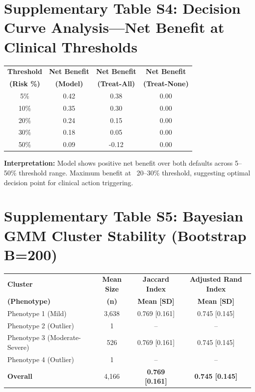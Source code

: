 \documentclass[11pt]{article}
\begin{document}
\section*{Supplementary Table S4: Decision Curve Analysis—Net Benefit at Clinical Thresholds}

\begin{table}[ht]
\centering
\begin{tabular}{cccc}
\toprule
\textbf{Threshold} & \textbf{Net Benefit} & \textbf{Net Benefit} & \textbf{Net Benefit} \\
\textbf{(Risk \%)} & \textbf{(Model)} & \textbf{(Treat-All)} & \textbf{(Treat-None)} \\
\midrule
5\% & 0.42 & 0.38 & 0.00 \\
10\% & 0.35 & 0.30 & 0.00 \\
20\% & 0.24 & 0.15 & 0.00 \\
30\% & 0.18 & 0.05 & 0.00 \\
50\% & 0.09 & -0.12 & 0.00 \\
\bottomrule
\end{tabular}
\end{table}

\textbf{Interpretation:} Model shows positive net benefit over both defaults across 5--50\% threshold range. Maximum benefit at ~20--30\% threshold, suggesting optimal decision point for clinical action triggering.

\section*{Supplementary Table S5: Bayesian GMM Cluster Stability (Bootstrap B=200)}

\begin{table}[ht]
\centering
\begin{tabular}{lccc}
\toprule
\textbf{Cluster} & \textbf{Mean Size} & \textbf{Jaccard Index} & \textbf{Adjusted Rand Index} \\
\textbf{(Phenotype)} & \textbf{(n)} & \textbf{Mean [SD]} & \textbf{Mean [SD]} \\
\midrule
Phenotype 1 (Mild) & 3,638 & 0.769 [0.161] & 0.745 [0.145] \\
Phenotype 2 (Outlier) & 1 & -- & -- \\
Phenotype 3 (Moderate-Severe) & 526 & 0.769 [0.161] & 0.745 [0.145] \\
Phenotype 4 (Outlier) & 1 & -- & -- \\
\midrule
\textbf{Overall} & 4,166 & \textbf{0.769 [0.161]} & \textbf{0.745 [0.145]} \\
\bottomrule
\end{tabular}
\end{table}
\end{document}
